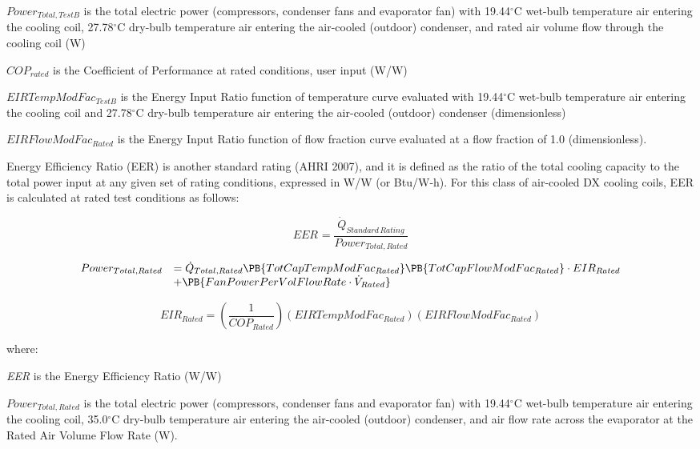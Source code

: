 \(Powe{r_{Total,TestB}}\) is the total electric power (compressors, condenser fans and evaporator fan) with 19.44\(^{\circ}\)C wet-bulb temperature air entering the cooling coil, 27.78\(^{\circ}\)C dry-bulb temperature air entering the air-cooled (outdoor) condenser, and rated air volume flow through the cooling coil (W)

\(CO{P_{rated}}\) is the Coefficient of Performance at rated conditions, user input (W/W)

\(EIRTempModFa{c_{TestB}}\) is the Energy Input Ratio function of temperature curve evaluated with 19.44\(^{\circ}\)C wet-bulb temperature air entering the cooling coil and 27.78\(^{\circ}\)C dry-bulb temperature air entering the air-cooled (outdoor) condenser (dimensionless)

\(EIRFlowModFa{c_{Rated}}\) is the Energy Input Ratio function of flow fraction curve evaluated at a flow fraction of 1.0 (dimensionless).

Energy Efficiency Ratio (EER) is another standard rating (AHRI 2007), and it is defined as the ratio of the total cooling capacity to the total power input at any given set of rating conditions, expressed in W/W (or Btu/W-h). For this class of air-cooled DX cooling coils, EER is calculated at rated test conditions as follows:

\begin{equation}
EE{R_{}} = \frac{{{{\dot Q}_{Standard\,Rating}}}}{{Powe{r_{Total,Rated}}}}
\end{equation}

\begin{equation}
  \begin{array}{rl}
    Power_{Total,Rated} &= \dot{Q}_{Total,Rated} \PB{TotCapTempModFac_{Rated}}\PB{TotCapFlowModFac_{Rated}}\cdot EIR_{Rated} \\
                        &+ \PB{FanPowerPerVolFlowRate \cdot \dot{V}_{Rated}}
  \end{array}
\end{equation}

\begin{equation}
EI{R_{Rated}} = \left( {\frac{1}{{CO{P_{Rated}}}}} \right)(EIRTempModFa{c_{Rated}})(EIRFlowModFa{c_{Rated}})
\end{equation}

where:

\emph{EER} is the Energy Efficiency Ratio (W/W)

\(Powe{r_{Total,Rated}}\) is the total electric power (compressors, condenser fans and evaporator fan) with 19.44\(^{\circ}\)C wet-bulb temperature air entering the cooling coil, 35.0\(^{\circ}\)C dry-bulb temperature air entering the air-cooled (outdoor) condenser, and air flow rate across the evaporator at the Rated Air Volume Flow Rate (W).

